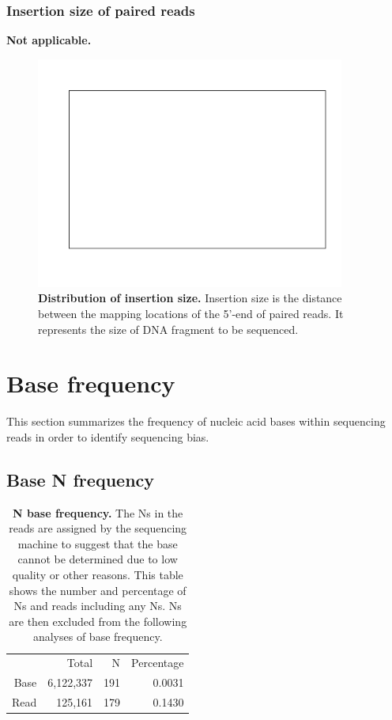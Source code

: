 \documentclass{article}
\begin{document}
\subsubsection{Insertion size of paired reads}
\textbf{Not applicable.}


\begin{center}
\begin{figure}
\includegraphics[width=4in, height=3in]{bamchop-pair-insert}
\caption{\textbf{Distribution of insertion size. }Insertion size is the distance between the mapping locations of the 5'-end of paired reads. It represents the size of DNA fragment to be sequenced.}
\end{figure}
\end{center}

\pagebreak
\section{Base frequency}
This section summarizes the frequency of nucleic acid bases within sequencing reads in order to identify sequencing bias. 

\subsection{Base N frequency}
\begin{table}
\begin{tabular}{|r|r|r|r|}
  \hline
 & Total & N & Percentage \\ 
  \rowcolor[gray]{0.9} \hline
Base & 6,122,337 & 191 & 0.0031 \\ 
  Read &   125,161 & 179 & 0.1430 \\ 
   \hline
\end{tabular}\caption{\textbf{N base frequency.} The Ns in the reads are assigned by the sequencing machine to suggest that the base cannot be determined due to low quality or other reasons. This table shows the number and percentage of Ns and reads including any Ns. Ns are then excluded from the following analyses of base frequency. }
\end{table}
\end{document}
